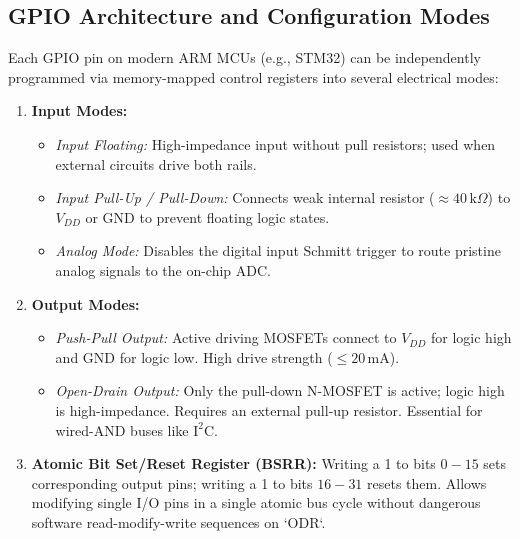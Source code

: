\documentclass[12pt,a4paper]{article}
\begin{document}
\subsection{GPIO Architecture and Configuration Modes}
Each GPIO pin on modern ARM MCUs (e.g., STM32) can be independently programmed via memory-mapped control registers into several electrical modes:
\begin{enumerate}[leftmargin=*]
  \item \textbf{Input Modes:}
  \begin{itemize}[leftmargin=*]
    \item \textit{Input Floating:} High-impedance input without pull resistors; used when external circuits drive both rails.
    \item \textit{Input Pull-Up / Pull-Down:} Connects weak internal resistor ($\approx 40\,\mathrm{k}\Omega$) to $V_{DD}$ or $\mathrm{GND}$ to prevent floating logic states.
    \item \textit{Analog Mode:} Disables the digital input Schmitt trigger to route pristine analog signals to the on-chip ADC.
  \end{itemize}
  \item \textbf{Output Modes:}
  \begin{itemize}[leftmargin=*]
    \item \textit{Push-Pull Output:} Active driving MOSFETs connect to $V_{DD}$ for logic high and $\mathrm{GND}$ for logic low. High drive strength ($\le 20\,\mathrm{mA}$).
    \item \textit{Open-Drain Output:} Only the pull-down N-MOSFET is active; logic high is high-impedance. Requires an external pull-up resistor. Essential for wired-AND buses like $\mathrm{I^2C}$.
  \end{itemize}
  \item \textbf{Atomic Bit Set/Reset Register (BSRR):}
  Writing a 1 to bits $0-15$ sets corresponding output pins; writing a 1 to bits $16-31$ resets them. Allows modifying single I/O pins in a single atomic bus cycle without dangerous software read-modify-write sequences on `ODR`.
\end{enumerate}
\end{document}
